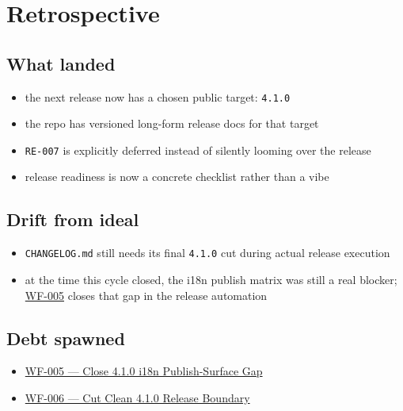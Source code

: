 \section{Retrospective}\label{record-202-retrospective}

\subsection{What landed}\label{record-202-what-landed}

\begin{itemize}
\tightlist
\item
  the next release now has a chosen public target: \texttt{4\allowbreak{}.\allowbreak{}1\allowbreak{}.\allowbreak{}0}
\item
  the repo has versioned long-form release docs for that target
\item
  \texttt{R\allowbreak{}E\allowbreak{}-\allowbreak{}0\allowbreak{}0\allowbreak{}7} is explicitly deferred instead of silently looming over the release
\item
  release readiness is now a concrete checklist rather than a vibe
\end{itemize}

\subsection{Drift from ideal}\label{record-202-drift-from-ideal}

\begin{itemize}
\tightlist
\item
  \texttt{C\allowbreak{}H\allowbreak{}A\allowbreak{}N\allowbreak{}G\allowbreak{}E\allowbreak{}L\allowbreak{}O\allowbreak{}G\allowbreak{}.\allowbreak{}m\allowbreak{}d} still needs its final \texttt{4\allowbreak{}.\allowbreak{}1\allowbreak{}.\allowbreak{}0} cut during actual release execution
\item
  at the time this cycle closed, the i18n publish matrix was still a real blocker; \href{https://github.com/flyingrobots/bijou/blob/cbd70612140e7a450d764b3c7be1c6af878b99bc/docs/design/WF-005-close-4-1-0-i18n-publish-surface-gap.md}{WF-005} closes that gap in the release automation
\end{itemize}

\subsection{Debt spawned}\label{record-202-debt-spawned}

\begin{itemize}
\tightlist
\item
  \href{https://github.com/flyingrobots/bijou/blob/cbd70612140e7a450d764b3c7be1c6af878b99bc/docs/design/WF-005-close-4-1-0-i18n-publish-surface-gap.md}{WF-005 --- Close 4.1.0 i18n Publish-Surface Gap}
\item
  \href{https://github.com/flyingrobots/bijou/blob/cbd70612140e7a450d764b3c7be1c6af878b99bc/docs/design/WF-006-cut-clean-4-1-0-release-boundary.md}{WF-006 --- Cut Clean 4.1.0 Release Boundary}
\end{itemize}

